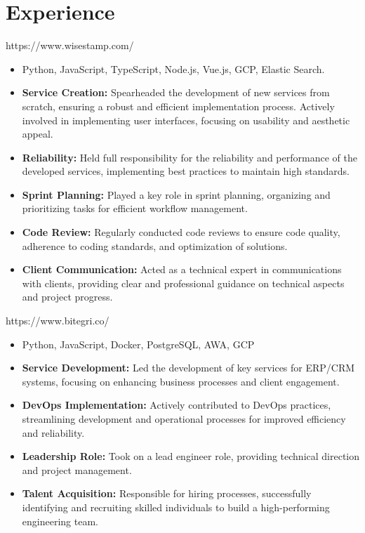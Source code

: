 \documentclass{resume}
\begin{document}



\section{Experience}


https://www.wisestamp.com/
\begin{itemize}
  \item Python, JavaScript, TypeScript, Node.js, Vue.js, GCP, Elastic Search.
  \item \textbf{Service Creation:} Spearheaded the development of new services from scratch, ensuring a robust and efficient implementation process. Actively involved in implementing user interfaces, focusing on usability and aesthetic appeal.
  \item \textbf{Reliability:} Held full responsibility for the reliability and performance of the developed services, implementing best practices to maintain high standards.
  \item \textbf{Sprint Planning:} Played a key role in sprint planning, organizing and prioritizing tasks for efficient workflow management.
  \item \textbf{Code Review:} Regularly conducted code reviews to ensure code quality, adherence to coding standards, and optimization of solutions.
  \item \textbf{Client Communication:} Acted as a technical expert in communications with clients, providing clear and professional guidance on technical aspects and project progress.
\end{itemize}


https://www.bitegri.co/
\begin{itemize}
  \item Python, JavaScript, Docker, PostgreSQL, AWA, GCP
  \item \textbf{Service Development:} Led the development of key services for ERP/CRM systems, focusing on enhancing business processes and client engagement.
  \item \textbf{DevOps Implementation:} Actively contributed to DevOps practices, streamlining development and operational processes for improved efficiency and reliability.
  \item \textbf{Leadership Role:} Took on a lead engineer role, providing technical direction and project management.
  \item \textbf{Talent Acquisition:} Responsible for hiring processes, successfully identifying and recruiting skilled individuals to build a high-performing engineering team.
\end{itemize}
\end{document}
